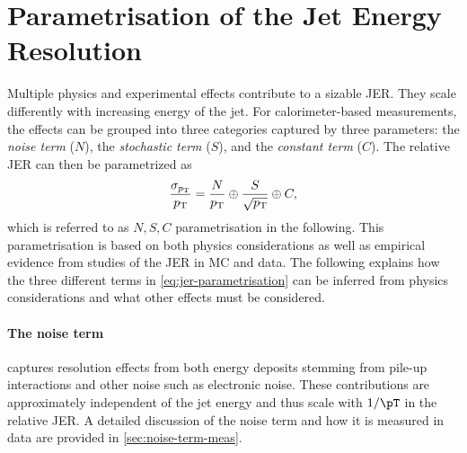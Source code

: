 


\section{Parametrisation of the Jet Energy Resolution}
\label{sec:jer}
Multiple physics and experimental effects contribute to a sizable JER. They scale differently with increasing energy of the jet. For calorimeter-based measurements, the effects can be grouped into three categories captured by three parameters: the \emph{noise term} ($N$), the \emph{stochastic term} ($S$), and the \emph{constant term} ($C$).
The relative JER can then be parametrized as
\begin{equation}
    \label{eq:jer-parametrisation}
    \frac{\sigma_{p_{\rm T}}}{p_{\rm T}} = \frac{N}{p_{\rm T}} \oplus \frac{S}{\sqrt{p_{\rm T}}} \oplus C,
\end{equation}
which is referred to as $N, S, C$ parametrisation in the following.
This parametrisation is based on both physics considerations as well as empirical evidence from studies of the JER in MC and data.
The following explains how the three different terms in \cref{eq:jer-parametrisation} can be inferred from physics considerations and what other effects must be considered.

\paragraph{The noise term} captures resolution effects from both energy deposits stemming from pile-up interactions and other noise such as electronic noise.
These contributions are approximately independent of the jet energy and thus scale with $1 / \pT$ in the relative JER. A detailed discussion of the noise term and how it is measured in data are provided in \cref{sec:noise-term-meas}.

